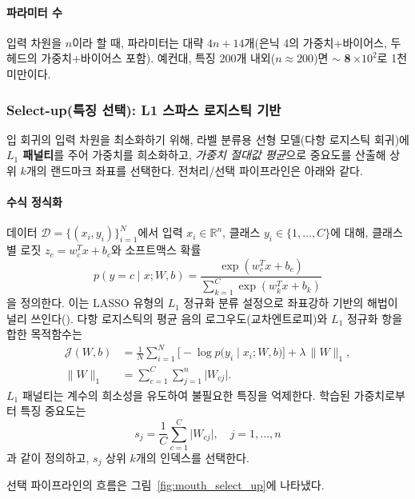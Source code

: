 \documentclass[10pt,a4paper]{article}
\begin{document}
\paragraph{파라미터 수} 입력 차원을 $n$이라 할 때, 파라미터는 대략 $4n + 14$개(은닉 4의 가중치+바이어스, 두 헤드의 가중치+바이어스 포함). 예컨대, 특징 200개 내외($n\approx 200$)면 \textbf{$\sim$\,\,8\,$\times10^2$}로 1천 미만이다.

\subsubsection*{Select-up(특징 선택): L1 스파스 로지스틱 기반}
입 회귀의 입력 차원을 최소화하기 위해, 라벨 분류용 선형 모델(다항 로지스틱 회귀)에 \textbf{$L_1$ 패널티}를 주어 가중치를 희소화하고, \emph{가중치 절대값 평균}으로 중요도를 산출해 상위 $k$개의 랜드마크 좌표를 선택한다. 전처리/선택 파이프라인은 아래와 같다.

\paragraph{수식 정식화} 데이터 $\mathcal{D}=\{(x_i,y_i)\}_{i=1}^N$에서 입력 $x_i\in\mathbb{R}^n$, 클래스 $y_i\in\{1,\dots,C\}$에 대해, 클래스별 로짓 $z_c= w_c^T x + b_c$와 소프트맥스 확률
\begin{equation}
  p(y=c\mid x;W,b) = \frac{\exp(w_c^T x + b_c)}{\sum_{k=1}^C \exp(w_k^T x + b_k)}
\end{equation}
을 정의한다. 이는 LASSO 유형의 $L_1$ 정규화 분류 설정으로 좌표강하 기반의 해법이 널리 쓰인다(\cite{Tibshirani1996Lasso,Friedman2010GLMNet}). 다항 로지스틱의 평균 음의 로그우도(교차엔트로피)와 $L_1$ 정규화 항을 합한 목적함수는
\begin{align}
  \mathcal{J}(W,b) &= \frac{1}{N}\sum_{i=1}^N \Big[-\log p\big(y_i\mid x_i;W,b\big)\Big] + \lambda\,\lVert W\rVert_1,\\
  \lVert W\rVert_1 &= \sum_{c=1}^C\sum_{j=1}^n \big|W_{c j}\big|.
\end{align}
$L_1$ 패널티는 계수의 희소성을 유도하여 불필요한 특징을 억제한다. 학습된 가중치로부터 특징 중요도는
\begin{equation}
  s_j = \frac{1}{C}\sum_{c=1}^C \big|W_{c j}\big|,\quad j=1,\dots,n
\end{equation}
과 같이 정의하고, $s_j$ 상위 $k$개의 인덱스를 선택한다.

선택 파이프라인의 흐름은 그림~\ref{fig:mouth_select_up}에 나타냈다.
\end{document}
